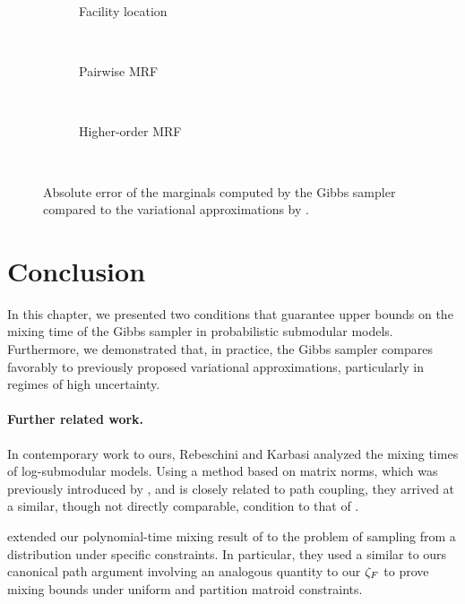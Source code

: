 \setlength{}
\setlength{}
\renewcommand{\subflen}{\textwidth}
\begin{figure}[tb]
  \begin{subfigure}[b]{\subflen}
    \centering
    
    \caption{Facility location}
    \label{fig:gibbs_exp1}
  \end{subfigure}\\[0.5em]
  \begin{subfigure}[b]{\subflen}
    \centering
    
    \caption{Pairwise MRF}
    \label{fig:gibbs_exp2}
  \end{subfigure}\\[0.5em]
  \begin{subfigure}[b]{\subflen}
    \centering
    
    \caption{Higher-order MRF}
    \label{fig:gibbs_exp3}
  \end{subfigure}\\[-1em]
  \caption{Absolute error of the marginals computed by the Gibbs sampler compared to the variational approximations by \cite{djolonga14}.}
  \label{fig:gibbs_exp}
\end{figure}


\section{Conclusion}
In this chapter, we presented two conditions that guarantee upper bounds on the mixing time of the Gibbs sampler in probabilistic submodular models.
Furthermore, we demonstrated that, in practice, the Gibbs sampler compares favorably to previously proposed variational approximations, particularly in regimes of high uncertainty.

\paragraph{Further related work.}
In contemporary work to ours, Rebeschini and Karbasi \citep{rebeschini15} analyzed the mixing times of log-sub\-mo\-du\-lar models.
Using a method based on matrix norms, which was previously introduced by \cite{dyer09}, and is closely related to path coupling, they arrived at a similar, though not directly comparable, condition to that of .

\cite{li16} extended our polynomial-time mixing result of  to the problem of sampling from a distribution under specific constraints.
In particular, they used a similar to ours canonical path argument involving an analogous quantity to our $\zeta_F$ to prove mixing bounds under uniform and partition matroid constraints.


